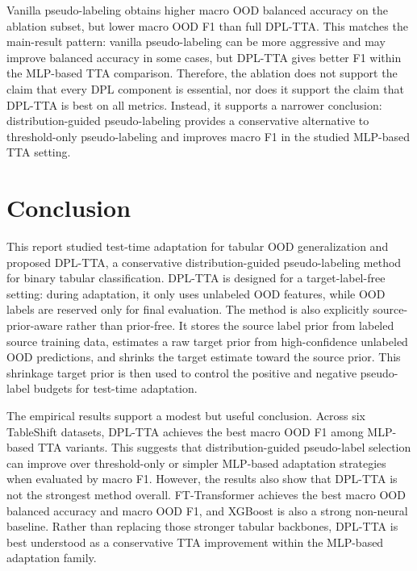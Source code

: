 \documentclass{article}
\begin{document}
Vanilla pseudo-labeling obtains higher macro OOD balanced accuracy on the ablation subset, but lower macro OOD F1 than full DPL-TTA. This matches the main-result pattern: vanilla pseudo-labeling can be more aggressive and may improve balanced accuracy in some cases, but DPL-TTA gives better F1 within the MLP-based TTA comparison. Therefore, the ablation does not support the claim that every DPL component is essential, nor does it support the claim that DPL-TTA is best on all metrics. Instead, it supports a narrower conclusion: distribution-guided pseudo-labeling provides a conservative alternative to threshold-only pseudo-labeling and improves macro F1 in the studied MLP-based TTA setting.




\section{Conclusion}

This report studied test-time adaptation for tabular OOD generalization and proposed DPL-TTA, a conservative distribution-guided pseudo-labeling method for binary tabular classification. DPL-TTA is designed for a target-label-free setting: during adaptation, it only uses unlabeled OOD features, while OOD labels are reserved only for final evaluation. The method is also explicitly source-prior-aware rather than prior-free. It stores the source label prior from labeled source training data, estimates a raw target prior from high-confidence unlabeled OOD predictions, and shrinks the target estimate toward the source prior. This shrinkage target prior is then used to control the positive and negative pseudo-label budgets for test-time adaptation.

The empirical results support a modest but useful conclusion. Across six TableShift datasets, DPL-TTA achieves the best macro OOD F1 among MLP-based TTA variants. This suggests that distribution-guided pseudo-label selection can improve over threshold-only or simpler MLP-based adaptation strategies when evaluated by macro F1. However, the results also show that DPL-TTA is not the strongest method overall. FT-Transformer achieves the best macro OOD balanced accuracy and macro OOD F1, and XGBoost is also a strong non-neural baseline. Rather than replacing those stronger tabular backbones, DPL-TTA is best understood as a conservative TTA improvement within the MLP-based adaptation family.
\end{document}
